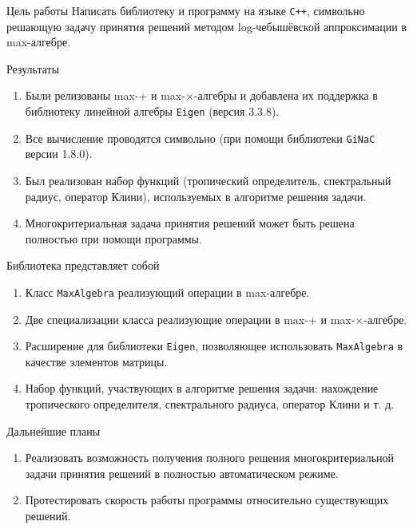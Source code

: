 \documentclass[11pt]{beamer}
\begin{document}
\begin{frame}
	\begin{block}{Цель работы}
		Написать библиотеку и программу на языке \texttt{C++}, символьно решающую задачу принятия решений методом log-чебышёвской аппроксимации в max-алгебре.
	\end{block}
	
	\begin{block}{Результаты}
		\begin{enumerate}
		  \item Были релизованы max-+ и max-$\times$-алгебры и добавлена их поддержка в библиотеку линейной алгебры \texttt{Eigen} (версия 3.3.8).
      \item Все вычисление проводятся символьно (при помощи библиотеки \texttt{GiNaC} версии 1.8.0).
			\item Был реализован набор функций (тропический определитель, спектральный радиус, оператор Клини), используемых в алгоритме решения задачи.
			\item Многокритериальная задача принятия решений может быть решена полностью при помощи программы.
		\end{enumerate}
	\end{block}
\end{frame}

\begin{frame}
Библиотека представляет собой
		\begin{enumerate}
			\item Класс \texttt{MaxAlgebra} реализующий операции в max-алгебре.
			\item Две специализации класса реализующие операции в max-+ и max-$\times$-алгебре.
			\item Расширение для библиотеки \texttt{Eigen}, позволяющее использовать \texttt{MaxAlgebra} в качестве элементов матрицы.
			\item Набор функций, участвующих в алгоритме решения задачи: нахождение тропического определителя, спектрального радиуса, оператор Клини и т. д.
		\end{enumerate}

\end{frame}

\begin{frame}{Дальнейшие планы}
	\begin{enumerate}
		\item Реализовать возможность получения полного решения многокритериальной задачи принятия решений в полностью автоматическом режиме.
		\item Протестировать скорость работы программы относительно существующих решений.
	\end{enumerate}
\end{frame}
\end{document}
